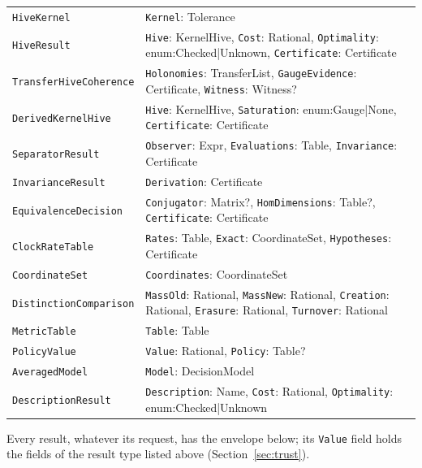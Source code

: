 \documentclass[11pt]{article}
\newcommand{\code}[1]{\texttt{#1}}
\theoremstyle{definition}
\theoremstyle{plain}
\begin{document}
{\begin{longtable}{>{\raggedright\arraybackslash}p{4.9cm}>{\raggedright\arraybackslash}p{9.1cm}}
\code{HiveKernel} & \code{Kernel}: Tolerance\\
\code{HiveResult} & \code{Hive}: KernelHive, \code{Cost}: Rational, \code{Optimality}: enum:Checked|\allowbreak{}Unknown, \code{Certificate}: Certificate\\
\code{TransferHiveCoherence} & \code{Holonomies}: TransferList, \code{GaugeEvidence}: Certificate, \code{Witness}: Witness?\\
\code{DerivedKernelHive} & \code{Hive}: KernelHive, \code{Saturation}: enum:Gauge|\allowbreak{}None, \code{Certificate}: Certificate\\
\code{SeparatorResult} & \code{Observer}: Expr, \code{Evaluations}: Table, \code{Invariance}: Certificate\\
\code{InvarianceResult} & \code{Derivation}: Certificate\\
\code{EquivalenceDecision} & \code{Conjugator}: Matrix?, \code{HomDimensions}: Table?, \code{Certificate}: Certificate\\
\code{ClockRateTable} & \code{Rates}: Table, \code{Exact}: CoordinateSet, \code{Hypotheses}: Certificate\\
\code{CoordinateSet} & \code{Coordinates}: CoordinateSet\\
\code{DistinctionComparison} & \code{MassOld}: Rational, \code{MassNew}: Rational, \code{Creation}: Rational, \code{Erasure}: Rational, \code{Turnover}: Rational\\
\code{MetricTable} & \code{Table}: Table\\
\code{PolicyValue} & \code{Value}: Rational, \code{Policy}: Table?\\
\code{AveragedModel} & \code{Model}: DecisionModel\\
\code{DescriptionResult} & \code{Description}: Name, \code{Cost}: Rational, \code{Optimality}: enum:Checked|\allowbreak{}Unknown\\
\bottomrule\end{longtable}}
Every result, whatever its request, has the envelope below; its \code{Value} field holds the fields of the result type listed above (Section~\ref{sec:trust}).
\end{document}
